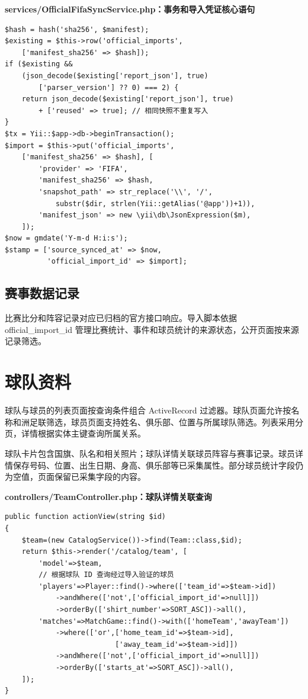 \documentclass[UTF8,a4paper,11pt]{ctexart}
\begin{document}
\noindent\textbf{services/OfficialFifaSyncService.php：事务和导入凭证核心语句}\par\vspace{2pt}
\begin{lstlisting}
$hash = hash('sha256', $manifest);
$existing = $this->row('official_imports',
    ['manifest_sha256' => $hash]);
if ($existing &&
    (json_decode($existing['report_json'], true)
        ['parser_version'] ?? 0) === 2) {
    return json_decode($existing['report_json'], true)
        + ['reused' => true]; // 相同快照不重复写入
}
$tx = Yii::$app->db->beginTransaction();
$import = $this->put('official_imports',
    ['manifest_sha256' => $hash], [
        'provider' => 'FIFA',
        'manifest_sha256' => $hash,
        'snapshot_path' => str_replace('\\', '/',
            substr($dir, strlen(Yii::getAlias('@app'))+1)),
        'manifest_json' => new \yii\db\JsonExpression($m),
    ]);
$now = gmdate('Y-m-d H:i:s');
$stamp = ['source_synced_at' => $now,
          'official_import_id' => $import];
\end{lstlisting}
\subsection{赛事数据记录}
比赛比分和阵容记录对应已归档的官方接口响应。导入脚本依据 official\_import\_id 管理比赛统计、事件和球员统计的来源状态，公开页面按来源记录筛选。

\section{球队资料}
球队与球员的列表页面按查询条件组合 ActiveRecord 过滤器。球队页面允许按名称和洲足联筛选，球员页面支持姓名、俱乐部、位置与所属球队筛选。列表采用分页，详情根据实体主键查询所属关系。

球队卡片包含国旗、队名和相关照片；球队详情关联球员阵容与赛事记录。球员详情保存号码、位置、出生日期、身高、俱乐部等已采集属性。部分球员统计字段仍为空值，页面保留已采集字段的内容。

\noindent\textbf{controllers/TeamController.php：球队详情关联查询}\par\vspace{2pt}
\begin{lstlisting}
public function actionView(string $id)
{
    $team=(new CatalogService())->find(Team::class,$id);
    return $this->render('/catalog/team', [
        'model'=>$team,
        // 根据球队 ID 查询经过导入验证的球员
        'players'=>Player::find()->where(['team_id'=>$team->id])
            ->andWhere(['not',['official_import_id'=>null]])
            ->orderBy(['shirt_number'=>SORT_ASC])->all(),
        'matches'=>MatchGame::find()->with(['homeTeam','awayTeam'])
            ->where(['or',['home_team_id'=>$team->id],
                          ['away_team_id'=>$team->id]])
            ->andWhere(['not',['official_import_id'=>null]])
            ->orderBy(['starts_at'=>SORT_ASC])->all(),
    ]);
}
\end{lstlisting}
\end{document}
